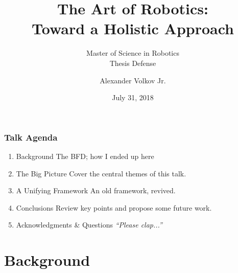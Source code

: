 \documentclass[aspectratio=169,handout]{beamer}
\title{The Art of Robotics:\\\vspace{0.2em}\huge{Toward a Holistic Approach}}
\subtitle{Master of Science in Robotics\\Thesis Defense}
\author{Alexander Volkov Jr.}
\date{July 31, 2018}
\begin{document}
	\setcounter{showProgressBar}{0}
	\setcounter{showSlideNumbers}{0}

	\frame{\titlepage}

	\begin{frame}
		\frametitle{Talk Agenda}
		\begin{enumerate}
			\setlength{\itemsep}{4mm}
			\item Background
				\textcolor{AVThesisGrey}{\footnotesize\hspace{1em} The BFD; how I ended up here}
				
			
			\item The Big Picture
				\textcolor{AVThesisGrey}{\footnotesize\hspace{1em} Cover the central themes of this talk.}
			
			\item A Unifying Framework
				\textcolor{AVThesisGrey}{\footnotesize\hspace{1em} An old framework, revived.}
			
	
%			
			\item Conclusions
				\textcolor{AVThesisGrey}{\footnotesize\hspace{1em} Review key points and propose some future work.}
			
			\item Acknowledgments \& Questions
				\textcolor{AVThesisGrey}{\footnotesize\hspace{1em} \emph{``Please clap...''}}
		\end{enumerate}
	\end{frame}

	\setcounter{framenumber}{0}
	\setcounter{showProgressBar}{1}
	\setcounter{showSlideNumbers}{1}
	
	\section{Background}
		
\end{document}
